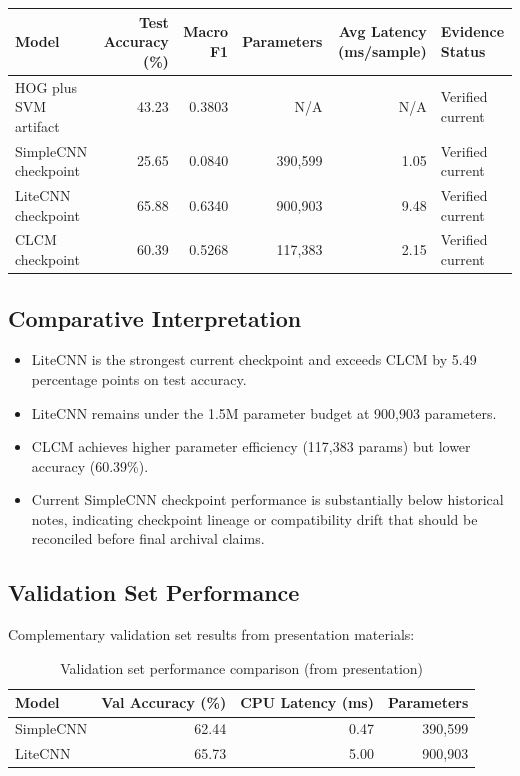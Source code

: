 \documentclass[12pt,a4paper]{article}
\begin{document}
\begin{table}[h!]
\centering
\small
\begin{tabularx}{\textwidth}{@{}X r r r r X@{}}
\toprule
Model & Test Accuracy (\%) & Macro F1 & Parameters & Avg Latency (ms/sample) & Evidence Status \\
\midrule
HOG plus SVM artifact & 43.23 & 0.3803 & N/A & N/A & Verified current \\
SimpleCNN checkpoint & 25.65 & 0.0840 & 390,599 & 1.05 & Verified current \\
LiteCNN checkpoint & 65.88 & 0.6340 & 900,903 & 9.48 & Verified current \\
CLCM checkpoint & 60.39 & 0.5268 & 117,383 & 2.15 & Verified current \\
\bottomrule
\end{tabularx}
\end{table}

\subsection{Comparative Interpretation}
\begin{itemize}[leftmargin=*]
    \item LiteCNN is the strongest current checkpoint and exceeds CLCM by 5.49 percentage points on test accuracy.
    \item LiteCNN remains under the 1.5M parameter budget at 900,903 parameters.
    \item CLCM achieves higher parameter efficiency (117,383 params) but lower accuracy (60.39\%).
    \item Current SimpleCNN checkpoint performance is substantially below historical notes, indicating checkpoint lineage or compatibility drift that should be reconciled before final archival claims.
\end{itemize}

\subsection{Validation Set Performance}
Complementary validation set results from presentation materials:

\begin{table}[h!]
\centering
\begin{tabular}{lrrr}
\toprule
Model & Val Accuracy (\%) & CPU Latency (ms) & Parameters \\
\midrule
SimpleCNN & 62.44 & 0.47 & 390,599 \\
LiteCNN & 65.73 & 5.00 & 900,903 \\
\bottomrule
\end{tabular}
\caption{Validation set performance comparison (from presentation)}
\label{tab:val_comparison}
\end{table}
\end{document}
